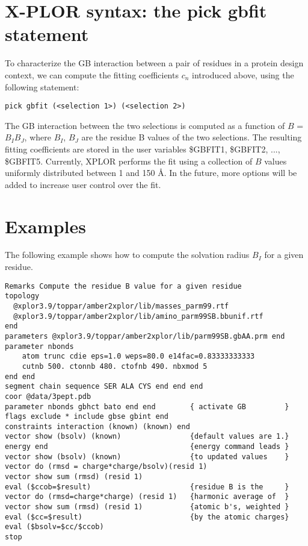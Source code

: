\documentclass[12pt]{report}
\begin{document}
\section{X-PLOR syntax: the pick gbfit statement}
To characterize the GB interaction between a pair of residues in a protein design context, we can compute the fitting
coefficients $c_n$ introduced above, using the following statement:
\begin{verbatim}
pick gbfit (<selection 1>) (<selection 2>)
\end{verbatim}
The GB interaction between the two selections is computed as a function of $B$ = $B_I B_J$, where $B_I$, $B_J$ are the
residue B values of the two selections. The resulting fitting coefficients are stored in the user variables \$GBFIT1,
\$GBFIT2, ..., \$GBFIT5. Currently, XPLOR performs the fit using a collection of $B$ values uniformly distributed between
1 and 150 \AA. In the future, more options will be added to increase user control over the fit. 

\section{Examples}
The following example shows how to compute the solvation radius $B_I$ for a given residue.
\begin{verbatim}
Remarks Compute the residue B value for a given residue
topology
  @xplor3.9/toppar/amber2xplor/lib/masses_parm99.rtf
  @xplor3.9/toppar/amber2xplor/lib/amino_parm99SB.bbunif.rtf
end
parameters @xplor3.9/toppar/amber2xplor/lib/parm99SB.gbAA.prm end
parameter nbonds
    atom trunc cdie eps=1.0 weps=80.0 e14fac=0.83333333333
    cutnb 500. ctonnb 480. ctofnb 490. nbxmod 5
end end
segment chain sequence SER ALA CYS end end end
coor @data/3pept.pdb
parameter nbonds gbhct bato end end        { activate GB         }
flags exclude * include gbse gbint end
constraints interaction (known) (known) end
vector show (bsolv) (known)                {default values are 1.}
energy end                                 {energy command leads }
vector show (bsolv) (known)                {to updated values    }
vector do (rmsd = charge*charge/bsolv)(resid 1)
vector show sum (rmsd) (resid 1)
eval ($ccob=$result)                       {residue B is the     }
vector do (rmsd=charge*charge) (resid 1)   {harmonic average of  }
vector show sum (rmsd) (resid 1)           {atomic b's, weighted }
eval ($cc=$result)                         {by the atomic charges} 
eval ($bsolv=$cc/$ccob) 
stop
\end{verbatim}
\end{document}
